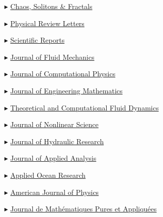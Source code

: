   \begin{itemize}

    \item[$\blacktriangleright$] \href{https://www.sciencedirect.com/journal/chaos-solitons-and-fractals/}{Chaos, Solitons \& Fractals}
  
    \item[$\blacktriangleright$] \href{https://journals.aps.org/prl/}{Physical Review Letters}
  
    \item[$\blacktriangleright$] \href{http://www.nature.com/srep/}%
    {Scientific Reports}
  
    \item[$\blacktriangleright$] \href{http://www.jfm.damtp.cam.ac.uk/}%
    {Journal of Fluid Mechanics}
  
    \item[$\blacktriangleright$] \href{http://www.elsevier.com/locate/jcp}%
    {Journal of Computational Physics}
    
    \item[$\blacktriangleright$] \href{http://www.springer.com/physics/classical+continuum+physics/journal/10665}%
    {Journal of Engineering Mathematics}
    
    \item[$\blacktriangleright$] \href{http://www.springer.com/materials/mechanics/journal/162}%
    {Theoretical and Computational Fluid Dynamics}
    
    \item[$\blacktriangleright$] \href{http://www.springer.com/mathematics/analysis/journal/332}%
    {Journal of Nonlinear Science}
    
    \item[$\blacktriangleright$] \href{http://www.tandfonline.com/toc/tjhr20/current}%
    {Journal of Hydraulic Research}
    
    \item[$\blacktriangleright$] \href{https://www.degruyter.com/view/journals/jaa/jaa-overview.xml}{Journal of Applied Analysis}
    
    \item[$\blacktriangleright$] \href{http://www.journals.elsevier.com/applied-ocean-research/}%
    {Applied Ocean Research}

    \item[$\blacktriangleright$] \href{https://pubs.aip.org/aapt/ajp/}{American Journal of Physics}
    
    \item[$\blacktriangleright$] \href{http://www.journals.elsevier.com/journal-de-mathematiques-pures-et-appliquees/}%
    {Journal de Math\'ematiques Pures et Appliqu\'ees}
    

\end{itemize}
